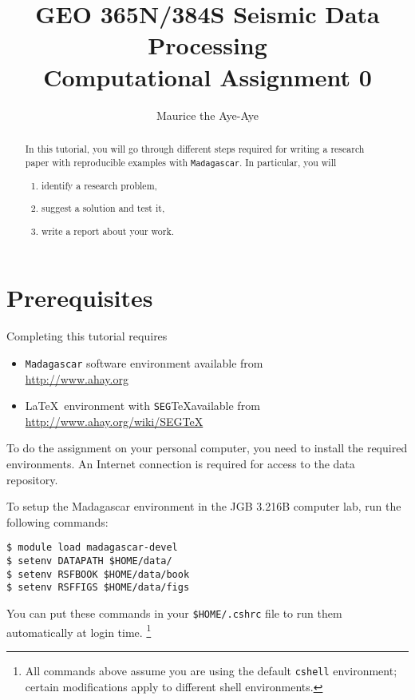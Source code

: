 \author{Maurice the Aye-Aye}
\title{GEO 365N/384S Seismic Data Processing \\ Computational Assignment 0}

\maketitle

\begin{abstract}
  In this tutorial, you will go through different steps required for writing a research paper with reproducible examples with \texttt{Madagascar}. In particular, you will
  \begin{enumerate}
    \item identify a research problem,
    \item suggest a solution and test it,
    \item write  a report about your work.
  \end{enumerate}
\end{abstract}

\section{Prerequisites}

Completing this tutorial requires
\begin{itemize}
\item \texttt{Madagascar} software environment available from \\
\url{http://www.ahay.org}
\item \LaTeX\ environment with \texttt{SEG}\TeX available from \\ 
\url{http://www.ahay.org/wiki/SEGTeX}
\end{itemize}
To do the assignment on your personal computer, you need to install
the required environments. An Internet connection is required for
access to the data repository.

To setup the Madagascar environment in the JGB 3.216B computer lab, run the following commands:
\begin{verbatim}
$ module load madagascar-devel
$ setenv DATAPATH $HOME/data/
$ setenv RSFBOOK $HOME/data/book
$ setenv RSFFIGS $HOME/data/figs
\end{verbatim}
You can put these commands in your \verb+$HOME/.cshrc+ file to run them automatically at login time. \footnote{All commands above assume you are using the default \texttt{cshell} environment; certain modifications apply to different shell environments.}

